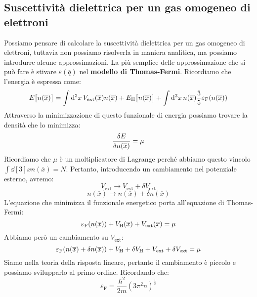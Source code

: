 \subsection{Suscettività dielettrica per un gas omogeneo di elettroni}
Possiamo pensare di calcolare la suscettività dielettrica per un gas omogeneo di elettroni, tuttavia non possiamo risolverla in maniera analitica, ma possiamo introdurre alcune approssimazioni. La più semplice delle approssimazione che si può fare è stivare $\varepsilon(\overline q)$ nel \textbf{modello di Thomas-Fermi}. Ricordiamo che l'energia è espressa come:
\begin{equation*}
    E\big[n(\overline x)\big]=\int \dd[3]{x} V_{\text{ext}}(\overline x)n(\overline x)+E_{\text H}\big[n(\overline x)\big]+\int \dd[3]{x}n(\overline x)\frac 35 \varepsilon_{\text F}(n(\overline x))
\end{equation*}
Attraverso la minimizzazione di questo funzionale di energia possiamo trovare la densità che lo minimizza:
\begin{equation*}
    \functionalderivative{E}{n(\overline x)}=\mu
\end{equation*}
Ricordiamo che $\mu$ è un moltiplicatore di Lagrange perché abbiamo questo vincolo $\int \dd[3]{x} n(\overline x)=N$. Pertanto, introducendo un cambiamento nel potenziale esterno, avremo:
\begin{equation*}
    V_{\text{ext}} \rightarrow V_{\text{ext}}+\delta V_{\text{ext}}
\end{equation*}
\begin{equation*}
    n(\overline{x}) \rightarrow n(\overline x)+\delta n(\overline x)
\end{equation*}
L'equazione che minimizza il funzionale energetico porta all'equazione di Thomas-Fermi:
\begin{equation*}
    \varepsilon_{\text F}(n(\overline x))+V_{\text H}(\overline x) + V_{\text{ext}}(\overline x) = \mu
\end{equation*}
Abbiamo però un cambiamento su $V_{\text{ext}}$:
\begin{equation*}
    \varepsilon_{\text{F}}(n(\overline x)+\delta n(\overline x))+V_{\text H}+\delta V_{\text{H}}+V_{\text{ext}}+\delta V_{\text{ext}}=\mu
\end{equation*}
Siamo nella teoria della risposta lineare, pertanto il cambiamento è piccolo e possiamo svilupparlo al primo ordine. Ricordando che:
\begin{equation*}
    \varepsilon_{\text{F}}=\frac{\hbar^2}{2m}(3\pi^2n)^{\frac 13}
\end{equation*}
